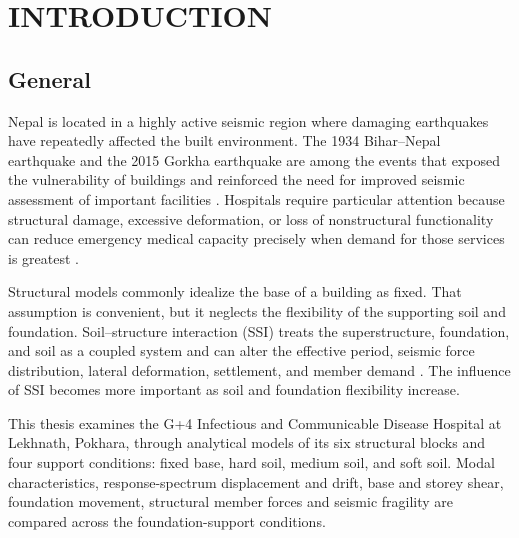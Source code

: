 \chapter{INTRODUCTION}
\section{General}
Nepal is located in a highly active seismic region where damaging earthquakes have repeatedly affected the built environment. The 1934 Bihar--Nepal earthquake and the 2015 Gorkha earthquake are among the events that exposed the vulnerability of buildings and reinforced the need for improved seismic assessment of important facilities \cite{gautam2016,adhikari2022}. Hospitals require particular attention because structural damage, excessive deformation, or loss of nonstructural functionality can reduce emergency medical capacity precisely when demand for those services is greatest \cite{guragain2004,subedi2022}.

Structural models commonly idealize the base of a building as fixed. That assumption is convenient, but it neglects the flexibility of the supporting soil and foundation. Soil--structure interaction (SSI) treats the superstructure, foundation, and soil as a coupled system and can alter the effective period, seismic force distribution, lateral deformation, settlement, and member demand \cite{wolf1985,poudel2024}. The influence of SSI becomes more important as soil and foundation flexibility increase.

This thesis examines the G+4 Infectious and Communicable Disease Hospital at Lekhnath, Pokhara, through analytical models of its six structural blocks and four support conditions: fixed base, hard soil, medium soil, and soft soil. Modal characteristics, response-spectrum displacement and drift, base and storey shear, foundation movement, structural member forces and seismic fragility are compared across the foundation-support conditions.
